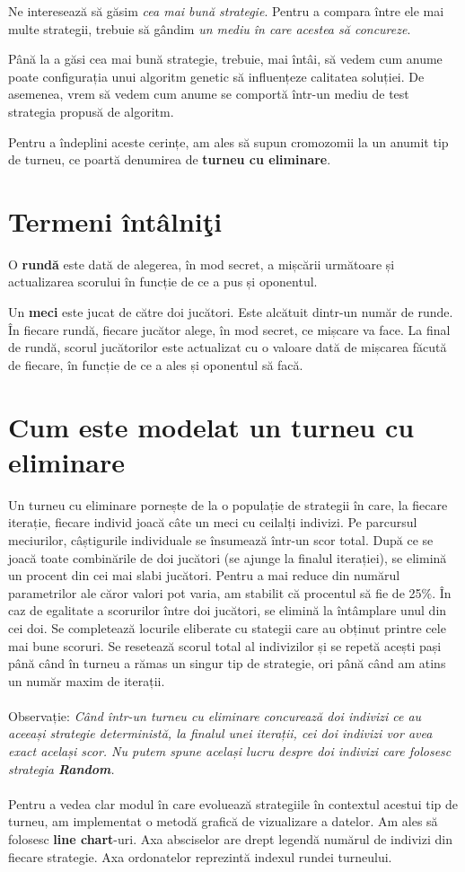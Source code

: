 Ne interesează să găsim \textit{cea mai bună strategie}. Pentru a compara între ele mai multe strategii, trebuie să gândim \textit{un mediu în care acestea să concureze}. 
 
Până la a găsi cea mai bună strategie, trebuie, mai întâi, să vedem cum anume poate configurația unui algoritm genetic să influențeze calitatea soluției. De asemenea, vrem să vedem cum anume se comportă într-un mediu de test strategia propusă de algoritm. 
 
Pentru a îndeplini aceste cerințe, am ales să supun cromozomii la un anumit tip de turneu, ce poartă denumirea de \textbf{turneu cu eliminare}.  

\section {Termeni întâlniţi}
O \textbf{rundă} este dată de alegerea, în mod secret, a mișcării următoare și actualizarea scorului în funcție de ce a pus și oponentul. 

Un \textbf{meci} este jucat de către doi jucători. Este alcătuit dintr-un număr de runde. În fiecare rundă, fiecare jucător alege, în mod secret, ce mișcare va face. La final de rundă, scorul jucătorilor este actualizat cu o valoare dată de mișcarea făcută de fiecare, în funcție de ce a ales și oponentul să facă. 

\section {Cum este modelat un turneu cu eliminare}
 
Un turneu cu eliminare pornește de la o populație de strategii în care, la fiecare iterație, fiecare individ joacă câte un meci cu ceilalți indivizi. Pe parcursul meciurilor, câștigurile individuale se însumează într-un scor total. După ce se joacă toate combinările de doi jucători (se ajunge la finalul iterației), se elimină un procent din cei mai slabi jucători.  Pentru a mai reduce din numărul parametrilor ale căror valori pot varia, am stabilit că procentul să fie de 25\%. În caz de egalitate a scorurilor între doi jucători, se elimină la întâmplare unul din cei doi. Se completează locurile eliberate cu stategii care au obținut printre cele mai bune scoruri. Se resetează scorul total al indivizilor și se repetă acești pași până când în turneu a rămas un singur tip de strategie, ori până când am atins un număr maxim de iterații.  
\\\\
Observație: \textit{Când într-un turneu cu eliminare concurează doi indivizi ce au aceeași strategie deterministă, la finalul unei iterații, cei doi indivizi vor avea exact același scor. Nu putem spune același lucru despre doi indivizi care folosesc strategia \textbf{Random}.}
\\\\
Pentru a vedea clar modul în care evoluează strategiile în contextul acestui tip de turneu, am implementat o metodă grafică de vizualizare a datelor. Am ales să folosesc \textbf{line chart}-uri. Axa absciselor are drept legendă numărul de indivizi din fiecare strategie. Axa ordonatelor reprezintă indexul rundei turneului.

